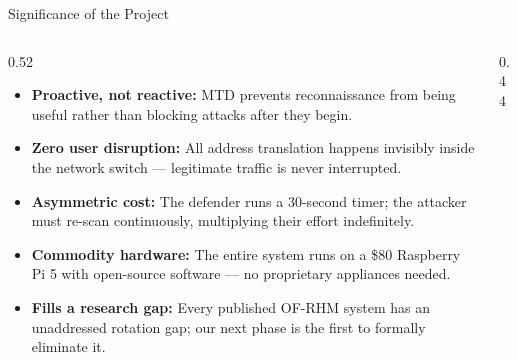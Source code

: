 \documentclass[aspectratio=169,10pt]{beamer}
\begin{document}
\begin{frame}{Significance of the Project}
  \begin{columns}[T]
    \begin{column}{0.52\textwidth}
      \begin{itemize}\setlength\itemsep{7pt}
        \item \textbf{Proactive, not reactive:} MTD prevents reconnaissance from being useful rather than blocking attacks after they begin.
        \item \textbf{Zero user disruption:} All address translation happens invisibly inside the network switch --- legitimate traffic is never interrupted.
        \item \textbf{Asymmetric cost:} The defender runs a 30-second timer; the attacker must re-scan continuously, multiplying their effort indefinitely.
        \item \textbf{Commodity hardware:} The entire system runs on a \$80 Raspberry Pi 5 with open-source software --- no proprietary appliances needed.
        \item \textbf{Fills a research gap:} Every published OF-RHM system has an unaddressed rotation gap; our next phase is the first to formally eliminate it.
      \end{itemize}
    \end{column}
    \begin{column}{0.44\textwidth}
      \vspace{0.4cm}
    \end{column}
  \end{columns}
\end{frame}
\end{document}
